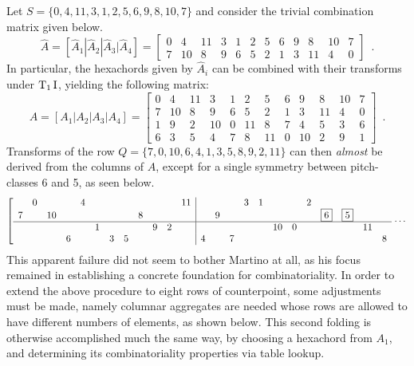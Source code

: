 \begin{example}
	\label{ex:martino-derivation}
	\cite[231]{Martino1961}
	Let $S = \{ 0, 4, 11, 3, 1, 2, 5, 6, 9, 8, 10, 7 \}$ and consider the trivial combination matrix given below.
	\begin{equation}
    	\hat{A} = [\hat{A}_1 | \hat{A}_2 | \hat{A}_3 | \hat{A}_4] = \left[
    	\begin{array}{ccc|ccc|ccc|ccc}
        	0 & 4 & 11 & 3 & 1 & 2 & 5 & 6 & 9 & 8 & 10 & 7 \\
        	7 & 10 & 8 & 9 & 6 & 5 & 2 & 1 & 3 & 11 & 4 & 0
    	\end{array}
    	\right] \enspace.
	\end{equation}
	In particular, the hexachords given by $\hat{A}_i$ can be combined with their transforms under $\operatorname{T}_1\operatorname{I}$, yielding the following matrix:
	\begin{equation}
    	A = [A_1 | A_2 | A_3 | A_4] = \left[
    	\begin{array}{ccc|ccc|ccc|ccc}
        	0 & 4 & 11 & 3 & 1 & 2 & 5 & 6 & 9 & 8 & 10 & 7 \\
        	7 & 10 & 8 & 9 & 6 & 5 & 2 & 1 & 3 & 11 & 4 & 0 \\
        	\hline
        	1 & 9 & 2 & 10 & 0 & 11 & 8 & 7 & 4 & 5 & 3 & 6 \\
        	6 & 3 & 5 & 4 & 7 & 8 & 11 & 0 & 10 & 2 & 9 & 1
    	\end{array}
    	\right] \enspace.
	\end{equation}
	Transforms of the row $Q = \{ 7, 0, 10, 6, 4, 1, 3, 5, 8, 9, 2, 11 \}$ can then \emph{almost} be derived from the columns of $A$, except for a single symmetry between pitch-classes 6 and 5, as seen below.
	\begin{equation}
        \left[
        \begin{array}{cccccccccccc|cccccccccccc}
            & 0 &&& 4 &&&&&&& 11 &&&& 3 & 1 &&& 2 &&&& \\
            7 && 10 &&&&&& 8 &&& && 9 &&&&&&& \boxed{6} & \boxed{5} && \\
            \hline
            &&&&& 1 &&&& 9 & 2 & &&&&&& 10 & 0 &&&& 11 & \\
            &&& 6 &&& 3 & 5 &&&& & 4 && 7 &&&&&&&&& 8
        \end{array}
        \right. \cdots
    \end{equation}
    This apparent failure did not seem to bother Martino at all, as his focus remained in establishing a concrete foundation for combinatoriality. In order to extend the above procedure to eight rows of counterpoint, some adjustments must be made, namely columnar aggregates are needed whose rows are allowed to have different numbers of elements, as shown below. This second folding is otherwise accomplished much the same way, by choosing a hexachord from $A_1$, and determining its combinatoriality properties via table lookup.

\end{example}
